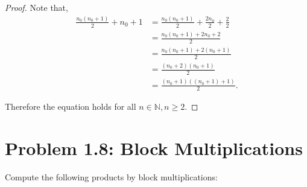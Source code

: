 \documentclass{amsbook}
\theoremstyle{definition}
\theoremstyle{remark}
\numberwithin{section}{chapter}
\numberwithin{equation}{chapter}
\begin{document}
\begin{proof}
Note that,
\begin{equation*}
\begin{split}
\frac{n_0(n_0 + 1)}{2}+n_0+1&=\frac{n_0(n_0 + 1)}{2}+\frac{2n_0}{2}+\frac{2}{2}\\
&=\frac{n_0(n_0 + 1)+2n_0+2}{2}\\
&=\frac{n_0(n_0 + 1)+2(n_0+1)}{2}\\
&=\frac{(n_0+2)(n_0 + 1)}{2}\\
&=\frac{(n_0+1)((n_0 + 1) + 1)}{2}.
\end{split}
\end{equation*}

Therefore the equation holds for all $n\in\mathbb{N}, n\geq 2$.
\end{proof}

\section{Problem 1.8: Block Multiplications}
Compute the following products by block multiplications:
\end{document}
